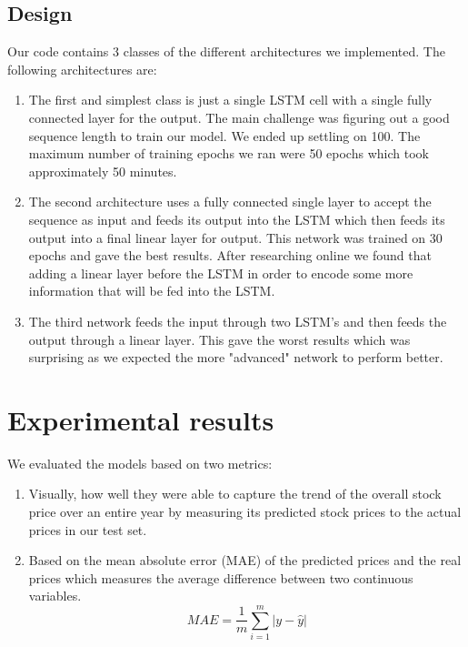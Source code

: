 \documentclass{article}
\begin{document}
\subsection{Design}

Our code contains 3 classes of the different architectures we implemented. The following architectures are:
\begin{enumerate}
    \item The first and simplest class is just a single LSTM cell with a single fully connected layer for the output. The main challenge was figuring out a good sequence length to train our model. We ended up settling on 100. The maximum number of training epochs we ran were 50 epochs which took approximately 50 minutes. 
    
    \item The second architecture uses a fully connected single layer to accept the sequence as input and feeds its output into the LSTM which then feeds its output into a final linear layer for output. This network was trained on 30 epochs and gave the best results. After researching online we found that adding a linear layer before the LSTM in order to encode some more information that will be fed into the LSTM.
    
    \item The third network feeds the input through two LSTM's and then feeds the output through a linear layer. This gave the worst results which was surprising as we expected the more "advanced" network to perform better. 
\end{enumerate}


\section{Experimental results}

We evaluated the models based on two metrics:
\begin{enumerate}
    \item Visually, how well they were able to capture the trend of the overall stock price over an entire year by measuring its predicted stock prices to the actual prices in our test set.
    
    \item Based on the mean absolute error (MAE) of the predicted prices and the real prices which measures the average difference between two continuous variables. $$MAE = \frac{1}{m}\sum_{i=1}^{m}|y-\hat{y}|$$
\end{enumerate}
\end{document}
